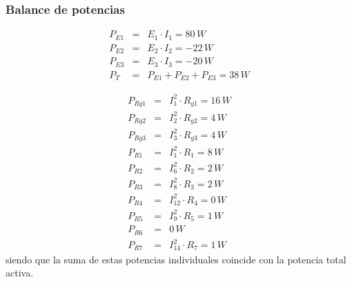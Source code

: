 \documentclass[10pt]{article}
\begin{document}
\subsubsection*{Balance de potencias}


\begin{eqnarray*}
P_{E1} & = & E_{1}\cdot I_{1}=80\, W\\
P_{E2} & = & E_{2}\cdot I_{2}=-22\, W\\
P_{E3} & = & E_{3}\cdot I_{3}=-20\, W\\
P_{T} & = & P_{E1}+P_{E2}+P_{E3}=38\, W
\end{eqnarray*}


\begin{eqnarray*}
P_{Rg1} & = & I_{1}^{2}\cdot R_{g1}=16\, W\\
P_{Rg2} & = & I_{2}^{2}\cdot R_{g2}=4\, W\\
P_{Rg3} & = & I_{3}^{2}\cdot R_{g3}=4\, W\\
P_{R1} & = & I_{1}^{2}\cdot R_{1}=8\, W\\
P_{R2} & = & I_{6}^{2}\cdot R_{2}=2\, W\\
P_{R3} & = & I_{8}^{2}\cdot R_{3}=2\, W\\
P_{R4} & = & I_{12}^{2}\cdot R_{4}=0\, W\\
P_{R5} & = & I_{9}^{2}\cdot R_{5}=1\, W\\
P_{R6} & = & 0\, W\\
P_{R7} & = & I_{14}^{2}\cdot R_{7}=1\, W
\end{eqnarray*}
siendo que la suma de estas potencias individuales coincide con la
potencia total activa.
\end{document}
